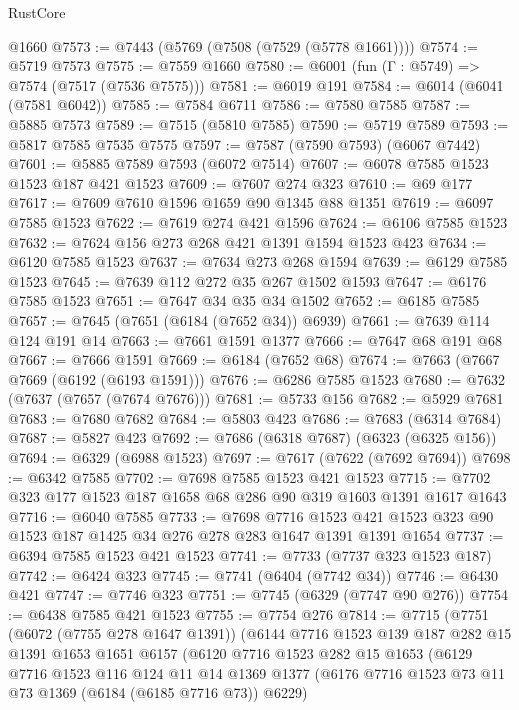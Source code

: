 \begin{lexlean}{RustCore}
\begin{coremodule}
{\begin{coremodule}
{{{{{{{{{{{{{{{{{{{{{{{{{{{{{{{{{{{{{{{{{{{{    @1660
@7573 := @7443 (@5769 (@7508 (@7529 (@5778 @1661))))
@7574 := @5719 @7573
@7575 := @7559 @1660
@7580 := @6001 (fun (Γ : @5749) => @7574 (@7517 (@7536 @7575)))
@7581 := @6019 @191
@7584 := @6014 (@6041 (@7581 @6042))
@7585 := @7584 @6711
@7586 := @7580 @7585
@7587 := @5885 @7573
@7589 := @7515 (@5810 @7585)
@7590 := @5719 @7589
@7593 := @5817 @7585 @7535 @7575
@7597 := @7587 (@7590 @7593) (@6067 @7442)
@7601 := @5885 @7589 @7593 (@6072 @7514)
@7607 := @6078 @7585 @1523 @1523 @187 @421 @1523
@7609 := @7607 @274 @323
@7610 := @69 @177
@7617 := @7609 @7610 @1596 @1659 @90 @1345 @88 @1351
@7619 := @6097 @7585 @1523
@7622 := @7619 @274 @421 @1596
@7624 := @6106 @7585 @1523
@7632 := @7624 @156 @273 @268 @421 @1391 @1594 @1523 @423
@7634 := @6120 @7585 @1523
@7637 := @7634 @273 @268 @1594
@7639 := @6129 @7585 @1523
@7645 := @7639 @112 @272 @35 @267 @1502 @1593
@7647 := @6176 @7585 @1523
@7651 := @7647 @34 @35 @34 @1502
@7652 := @6185 @7585
@7657 := @7645 (@7651 (@6184 (@7652 @34)) @6939)
@7661 := @7639 @114 @124 @191 @14
@7663 := @7661 @1591 @1377
@7666 := @7647 @68 @191 @68
@7667 := @7666 @1591
@7669 := @6184 (@7652 @68)
@7674 := @7663 (@7667 @7669 (@6192 (@6193 @1591)))
@7676 := @6286 @7585 @1523
@7680 := @7632 (@7637 (@7657 (@7674 @7676)))
@7681 := @5733 @156
@7682 := @5929 @7681
@7683 := @7680 @7682
@7684 := @5803 @423
@7686 := @7683 (@6314 @7684)
@7687 := @5827 @423
@7692 := @7686 (@6318 @7687) (@6323 (@6325 @156))
@7694 := @6329 (@6988 @1523)
@7697 := @7617 (@7622 (@7692 @7694))
@7698 := @6342 @7585
@7702 := @7698 @7585 @1523 @421 @1523
@7715 := @7702 @323 @177 @1523 @187 @1658 @68 @286 @90 @319 @1603 @1391 @1617 @1643
@7716 := @6040 @7585
@7733 := @7698
    @7716
    @1523
    @421
    @1523
    @323
    @90
    @1523
    @187
    @1425
    @34
    @276
    @278
    @283
    @1647
    @1391
    @1391
    @1654
@7737 := @6394 @7585 @1523 @421 @1523
@7741 := @7733 (@7737 @323 @1523 @187)
@7742 := @6424 @323
@7745 := @7741 (@6404 (@7742 @34))
@7746 := @6430 @421
@7747 := @7746 @323
@7751 := @7745 (@6329 (@7747 @90 @276))
@7754 := @6438 @7585 @421 @1523
@7755 := @7754 @276
@7814 := @7715
    (@7751
      (@6072 (@7755 @278 @1647 @1391))
      (@6144
        @7716
        @1523
        @139
        @187
        @282
        @15
        @1391
        @1653
        @1651
        @6157
        (@6120
          @7716
          @1523
          @282
          @15
          @1653
          (@6129
            @7716
            @1523
            @116
            @124
            @11
            @14
            @1369
            @1377
            (@6176 @7716 @1523 @73 @11 @73 @1369 (@6184 (@6185 @7716 @73)) @6229)
}}}}}}}}}}}}}}}}}}}}}}}}}}}}}}}}}}}}}}}}}}}}
\end{coremodule}}
\end{coremodule}
\end{lexlean}
